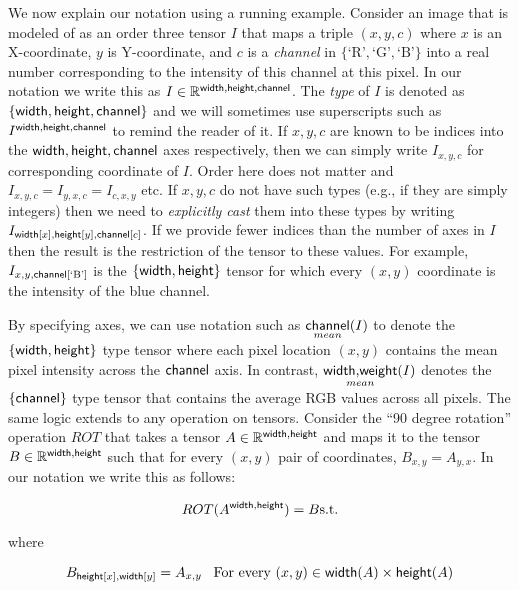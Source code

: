 \documentclass{article}
\newcommand{\mean}[1]{\sfun{mean}{#1}}
\begin{document}
We now explain our notation using a running example. Consider an image that is modeled of as an order three tensor $I$ that maps a triple $(x,y,c)$ where $x$ is an X-coordinate, $y$ is Y-coordinate, and $c$ is a \emph{channel} in $\{ \text{`R'}, \text{`G'}, \text{`B'} \}$ into a real number corresponding to the intensity of this channel at this pixel.
In our notation we write this as $I \in \mathbb{R}^{\mathsf{width},\mathsf{height},\mathsf{channel}}$. 
The \emph{type} of $I$ is denoted as $\{ \mathsf{width},\mathsf{height},\mathsf{channel} \}$ and we will sometimes use  superscripts such as $I^{\mathsf{width},\mathsf{height},\mathsf{channel}}$ to remind the reader of it. 
If $x,y,c$ are known to be indices into the $\mathsf{width},\mathsf{height},\mathsf{channel}$ axes respectively, then we can simply write $I_{x,y,c}$ for corresponding coordinate of $I$. Order here does not matter and $I_{x,y,c} = I_{y,x,c}=I_{c,x,y}$ etc. 
If $x,y,c$ do not have such types (e.g., if they are simply integers) then we need to \emph{explicitly cast} them into these types by writing $I_{\mathsf{width}[x],\mathsf{height}[y],\mathsf{channel}[c]}$.
If we provide fewer indices than the number of axes in $I$ then the result is the restriction of the tensor to these values.
For example, $I_{x,y,\mathsf{channel}[\text{`B'}]}$ is the $\{ \mathsf{width} , \mathsf{height} \}$ tensor for which every $(x,y)$  coordinate is the intensity of the blue channel.


By specifying axes, we can use notation such as  $\mean{\name{channel}}(I)$ to denote the $\{ \mathsf{width} , \mathsf{height} \}$ type tensor where each pixel location $(x,y)$ contains the mean pixel intensity across the $\mathsf{channel}$ axis.
In contrast, $\mean{\name{width},\name{weight}}(I)$ denotes the $\{ \mathsf{channel} \}$ type tensor that contains the average RGB values across all pixels.
The same logic extends to any operation on tensors. Consider the ``90 degree rotation'' operation $ROT$ that takes a tensor $A \in \mathbb{R}^{\mathsf{width},\mathsf{height}}$ and maps it to the tensor $B \in \mathbb{R}^{\mathsf{width},\mathsf{height}}$ such that for every $(x,y)$ pair of coordinates, $B_{x,y} = A_{y,x}$.
In our notation we write this as follows: 

\[
  ROT(A^{\mathsf{width},\mathsf{height}}) = B \text{s.t.} 
\]

where

\begin{equation}
  B_{\mathsf{height}[x],\mathsf{width}[y]} = A_{x,y} \;\;\; \text{For every } (x,y) \in \mathsf{width}(A)\times \mathsf{height}(A) \label{eq:rotate}
\end{equation}
\end{document}
